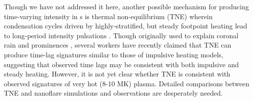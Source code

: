 Though we have not addressed it here, another possible mechanism for producing time-varying intensity in \AR s is thermal non-equilibrium (TNE) wherein condensation cycles driven by highly-stratified, but steady footpoint heating lead to long-period intensity pulsations \citep{kuin_thermal_1982}. Though originally used to explain coronal rain \citep{antolin_coronal_2010,antolin_multithermal_2015,auchere_coronal_2018} and prominences \citep{antiochos_model_1991}, several workers \citep{mok_three-dimensional_2016,winebarger_investigation_2016,froment_long-period_2017,winebarger_identifying_2018,froment_occurrence_2018} have recently claimed that TNE can produce time-lag signatures similar to those of impulsive heating models, suggesting that observed time lags may be consistent with both impulsive and steady heating. However, it is not yet clear whether TNE is consistent with observed signatures of very hot (8-10 MK) plasma. Detailed comparisons between TNE and nanoflare simulations and observations are desperately needed.
